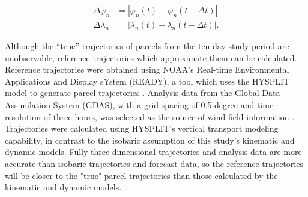 \begin{align}
    \Delta \varphi_n &= | \varphi_n (t) - \varphi_n (t - \Delta t) | \\
    \Delta \lambda_n &= |\lambda_n (t) - \lambda_n (t - \Delta t)|.
\end{align}

Although the ``true'' trajectories of parcels from the ten-day study period are unobservable, reference trajectories which approximate them can be calculated.
Reference trajectories were obtained using NOAA's Real-time Environmental Applications and Display sYstem (READY), a tool which uses the HYSPLIT model to generate parcel trajectories \cite{rolph_real-time_2017}.
Analysis data from the Global Data Assimilation System (GDAS), with a grid spacing of 0.5 degree and time resolution of three hours, was selected as the source of wind field information \cite{noaa_global_2004}.
Trajectories were calculated using HYSPLIT's vertical transport modeling capability, in contrast to the isobaric assumption of this study's kinematic and dynamic models. 
Fully three-dimensional trajectories and analysis data are more accurate than isobaric trajectories and forecast data, 
so the reference trajectories will be closer to the "true" parcel trajectories than those calculated by the kinematic and dynamic models.  \cite{stohl_computation_1998}.
  
